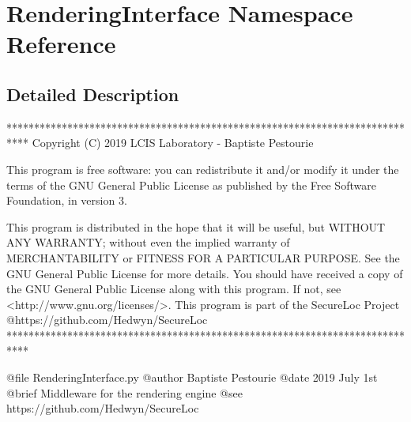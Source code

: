 \hypertarget{namespace_rendering_interface}{}\section{Rendering\+Interface Namespace Reference}
\label{namespace_rendering_interface}


\subsection{Detailed Description}
\begin{DoxyVerb}****************************************************************************
Copyright (C) 2019 LCIS Laboratory - Baptiste Pestourie

This program is free software: you can redistribute it and/or modify
it under the terms of the GNU General Public License as published by
the Free Software Foundation, in version 3.

This program is distributed in the hope that it will be useful,
but WITHOUT ANY WARRANTY; without even the implied warranty of
MERCHANTABILITY or FITNESS FOR A PARTICULAR PURPOSE. See the
GNU General Public License for more details.
You should have received a copy of the GNU General Public License
along with this program. If not, see <http://www.gnu.org/licenses/>.
This program is part of the SecureLoc Project @https://github.com/Hedwyn/SecureLoc
 ****************************************************************************

@file RenderingInterface.py
@author Baptiste Pestourie
@date 2019 July 1st
@brief Middleware for the rendering engine
@see https://github.com/Hedwyn/SecureLoc
\end{DoxyVerb}
 